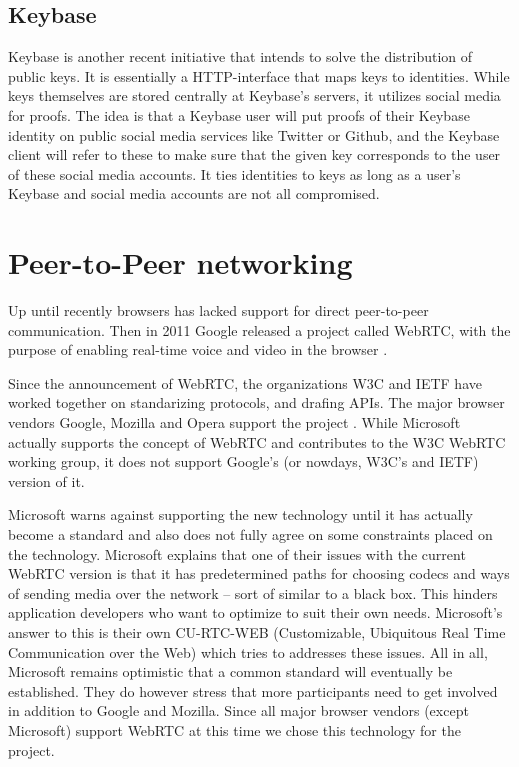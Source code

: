 \subsection{Keybase}
Keybase \cite{Keybase:Online} is another recent initiative that intends to solve the distribution of public keys. It is essentially a HTTP-interface that maps keys to identities. While keys themselves are stored centrally at Keybase's servers, it utilizes social media for proofs. The idea is that a Keybase user will put proofs of their Keybase identity on public social media services like Twitter or Github, and the Keybase client will refer to these to make sure that the given key corresponds to the user of these social media accounts. It ties identities to keys as long as a user's Keybase and social media accounts are not all compromised.

\section{Peer-to-Peer networking}


Up until recently browsers has lacked support for direct peer-to-peer communication. Then in 2011 Google released a project called WebRTC, with the purpose of enabling real-time voice and video in the browser \cite{WebRTCMemo:Online}.

Since the announcement of WebRTC, the organizations W3C and IETF have worked together on standarizing protocols, and drafing APIs. The major browser vendors Google, Mozilla and Opera support the project \cite{WebRTCAndMicrosoft:2012:Online}. While Microsoft actually supports the concept of WebRTC and contributes to the W3C WebRTC working group, it does not support Google’s (or nowdays, W3C’s and IETF) version of it\cite{WebRTCAndMicrosoft:2012:Online}.

Microsoft warns against supporting the new technology until it has actually become a standard and also does not fully agree on some constraints placed on the technology\cite{WebRTCAndMicrosoft:2012:Online}. Microsoft explains that one of their issues with the current WebRTC version is that it has predetermined paths for choosing codecs and ways of sending media over the network – sort of similar to a black box. This hinders application developers who want to optimize to suit their own needs. Microsoft’s answer to this is their own CU-RTC-WEB (Customizable, Ubiquitous Real Time Communication over the Web) which tries to addresses these issues.
All in all, Microsoft remains optimistic that a common standard will eventually be established\cite{WebRTCAndMicrosoft:2012:Online}. They do however stress that more participants need to get involved in addition to Google and Mozilla. Since all major browser vendors (except Microsoft) support WebRTC at this time we chose this technology for the project.

